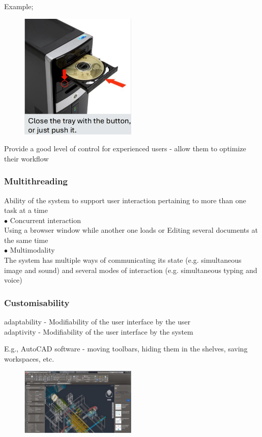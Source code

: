 \documentclass[]{project_plan}
\newcommand{\bulletPoint}{\hspace{-3.1pt}$\bullet$ \hspace{5pt}}
\begin{document}
Example;
\begin{figure}[h!]
  \centering
  \includegraphics[width=15em]{substitutivity_example.png}
\end{figure}

Provide a good level of control for experienced users - allow them to optimize their workflow

\subsubsection{Multithreading}
Ability of the system to support user interaction pertaining to more than one
task at a time\\
\bulletPoint Concurrent interaction\\Using a browser window while another one
loads or Editing several documents at the same time\\
\bulletPoint Multimodality\\
The system has multiple ways of communicating its state
(e.g. simultaneous image and sound)
and several modes of interaction
(e.g. simultaneous typing and voice)

\subsubsection{Customisability}
adaptability - Modifiability of the user interface by the user\\
adaptivity - Modifiability of the user interface by the system

E.g., AutoCAD software - moving toolbars, hiding them in the shelves, saving workspaces, etc.
\begin{figure}[h!]
  \centering
  \includegraphics[width=15em]{customisability_example.png}
\end{figure}
\end{document}
